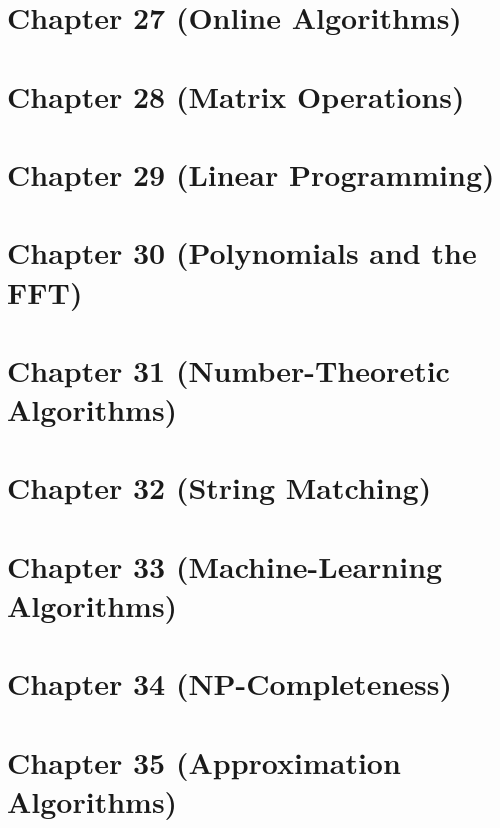 \documentclass[11pt]{article}
\begin{document}
\section*{Chapter 27 (Online Algorithms)}
\newpage

\section*{Chapter 28 (Matrix Operations)}
\newpage

\section*{Chapter 29 (Linear Programming)}
\newpage

\section*{Chapter 30 (Polynomials and the FFT)}
\newpage

\section*{Chapter 31 (Number-Theoretic Algorithms)}
\newpage

\section*{Chapter 32 (String Matching)}
\newpage

\section*{Chapter 33 (Machine-Learning Algorithms)}
\newpage

\section*{Chapter 34 (NP-Completeness)}
\newpage

\section*{Chapter 35 (Approximation Algorithms)}
\newpage
\end{document}
